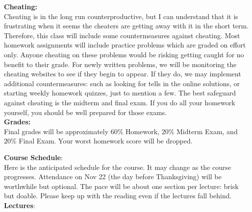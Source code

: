 \documentclass[12pt]{article}
\begin{document}
\noindent
\textbf{Cheating:}\\
Cheating is in the long run counterproductive, but I can understand that it is frustrating when it seems the cheaters are getting away with it in the short term.  Therefore, this class will include some countermeasures against cheating.  Most homework assignments will include practice problems which are graded on effort only.  Anyone cheating on these problems would be risking getting caught for no benefit to their grade.  For newly written problems, we will be monitoring the cheating websites to see if they begin to appear.  If they do, we may implement additional countermeasures: such as looking for tells in the online solutions, or starting weekly homework quizzes, just to mention a few.  The best safeguard against cheating is the midterm and final exam.  If you do all your homework yourself, you should be well prepared for those exams.\\

\noindent
\textbf {Grades:}\\
Final grades will be approximately $60\%$ Homework, $20\%$ Midterm Exam, and
$20\%$ Final Exam.  Your worst homework score will be dropped.\\
\noindent

\newpage

\noindent
\textbf {Course Schedule}:\\
Here is the anticipated schedule for the course.  It may change as the
course progresses.  Attendance on Nov 22 (the day before Thanksgiving) will be worthwhile but optional.
The pace will be about one section per lecture: brisk but doable.  Please keep up with the reading even if the lectures fall behind.\\

\noindent
\textbf {Lectures}:\\
\end{document}
